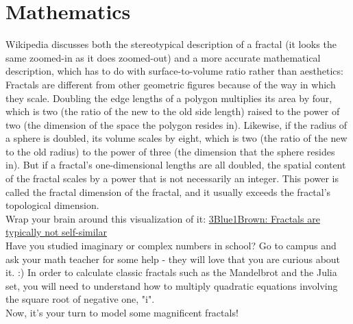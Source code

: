 \documentclass{42-en}
\begin{document}
\chapter{Mathematics}

Wikipedia discusses both the stereotypical description of a fractal (it looks the same zoomed-in as it does zoomed-out) and a more accurate mathematical description, which has to do with surface-to-volume ratio rather than aesthetics: \\

Fractals are different from other geometric figures because of the way in which they scale. Doubling the edge lengths of a polygon multiplies its area by four, which is two (the ratio of the new to the old side length) raised to the power of two (the dimension of the space the polygon resides in). Likewise, if the radius of a sphere is doubled, its volume scales by eight, which is two (the ratio of the new to the old radius) to the power of three (the dimension that the sphere resides in). But if a fractal's one-dimensional lengths are all doubled, the spatial content of the fractal scales by a power that is not necessarily an integer. This power is called the fractal dimension of the fractal, and it usually exceeds the fractal's topological dimension.\\

Wrap your brain around this visualization of it: \href{https://www.youtube.com/watch?v=gB9n2gHsHN4}{3Blue1Brown: Fractals are typically not self-similar}\\

Have you studied imaginary or complex numbers in school? Go to campus and ask your math teacher for some help - they will love that you are curious about it. :) In order to calculate classic fractals such as the Mandelbrot and the Julia set, you will need to understand how to multiply quadratic equations involving the square root of negative one, "i".\\

Now, it’s your turn to model some magnificent fractals!

\end{document}
